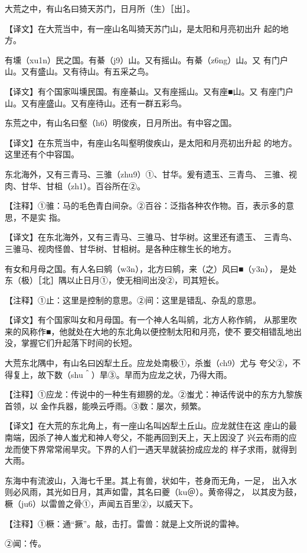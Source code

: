 \documentclass[a4paper,12pt,UTF8,twoside]{ctexbook}
\begin{document}
大荒之中，有山名曰猗天苏门，日月所（生）［出］。

【译文】在大荒当中，有一座山名叫猗天苏门山，是太阳和月亮初出升 起的地方。

有壎（xu1n）民之国。有綦（j9）山。又有摇山。有綦（z6ng）山。又 有门户山。又有盛山。又有待山。有五采之鸟。

【译文】有个国家叫壎民国。有座綦山。又有座摇山。又有座■山。又 有座门户山。又有座盛山。又有座待山。还有一群五彩鸟。

东荒之中，有山名曰壑（h6）明俊疾，日月所出。有中容之国。

【译文】在东荒当中，有座山名叫壑明俊疾山，是太阳和月亮初出升起 的地方。这里还有个中容国。

东北海外，又有三青马、三骓（zhu9）①、甘华。爰有遗玉、三青鸟、 三骓、视肉、甘华、甘柤（zh1）。百谷所在②。

【注释】①骓：马的毛色青白间杂。②百谷：泛指各种农作物。百，表示多的意思，不是实 指。

【译文】在东北海外，又有三青马、三骓马、甘华树。这里还有遗玉、 三青鸟、三骓马、视肉怪兽、甘华树、甘柤树。是各种庄稼生长的地方。

有女和月母之国。有人名曰鹓（w3n），北方曰鹓，来（之）风曰■（y3n）， 是处东（极）［北］隅以止日月①，使无相间出没②，司其短长。

【注释】①止：这里是控制的意思。②间：这里是错乱、杂乱的意思。

【译文】有个国家叫女和月母国。有一个神人名叫鹓，北方人称作鹓， 从那里吹来的风称作■，他就处在大地的东北角以便控制太阳和月亮，使不 要交相错乱地出没，掌握它们升起落下时间的长短。

大荒东北隅中，有山名曰凶犁土丘。应龙处南极①，杀蚩（ch9）尤与 夸父②，不得复上，故下数（shu＾）旱③。旱而为应龙之状，乃得大雨。

【注释】①应龙：传说中的一种生有翅膀的龙。②蚩尤：神话传说中的东方九黎族首领，以 金作兵器，能唤云呼雨。③数：屡次，频繁。

【译文】在大荒的东北角上，有一座山名叫凶犁土丘山。应龙就住在这 座山的最南端，因杀了神人蚩尤和神人夸父，不能再回到天上，天上因没了 兴云布雨的应龙而使下界常常闹旱灾。下界的人们一遇天旱就装扮成应龙的 样子求雨，就得到大雨。

东海中有流波山，入海七千里。其上有兽，状如牛，苍身而无角，一足， 出入水则必风雨，其光如日月，其声如雷，其名曰夔（ku＠）。黄帝得之， 以其皮为鼓，橛（ju6）以雷兽之骨①，声闻五百里②，以威天下。

【注释】①橛：通“撅”。敲，击打。雷兽：就是上文所说的雷神。

②闻：传。
\end{document}
